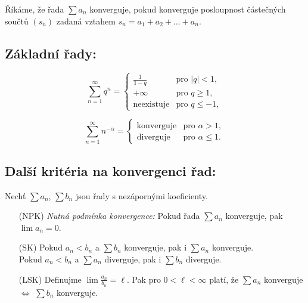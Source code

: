 \begin{definition}
	Říkáme, že řada $\sum a_n$ konverguje, pokud konverguje posloupnost částečných součtů $(s_n)$ zadaná vztahem $s_n = a_1 + a_2 + \dots + a_n$. 
	\label{def:konvergentni_rada}
\end{definition}

\subsection{Základní řady:}

\begin{equation}
	\sum_{n=1}^{\infty} q^n =
	\begin{cases}
		\frac{1}{1-q}			& \text{pro } |q| < 1, \\
		+\infty 	   			& \text{pro } q \geq 1, \\
		\text{neexistuje} & \text{pro } q \leq -1,
	\end{cases}
	\label{eq:rada_q_na_n}
\end{equation}

\begin{equation}
	\sum_{n=1}^{\infty} n^{-\alpha} =
	\begin{cases}
		\text{konverguje}  & \text{pro } \alpha > 1, \\
		\text{diverguje}   & \text{pro } \alpha \leq 1.
	\end{cases}
	\label{eq:rada_n_na_alpha}
\end{equation}


\subsection{Další kritéria na konvergenci řad:}

\begin{theorem}
	Nechť $\sum a_n$, $\sum b_n$ jsou řady s nezápornými koeficienty. 
	\begin{itemize}

		\item[(NPK)] \emph{Nutná podmínka konvergence:} \label{thm:konvergence_kriterium_nutna_podminka_konvergence}
			Pokud řada $\sum a_n$ konverguje, pak $\lim a_n = 0$.

		\item[(SK)] \label{thm:konvergence_kriterium_SK}
			Pokud $a_n < b_n$ a $\sum b_n$ konverguje, pak i $\sum a_n$ konverguje. \\ 
			Pokud $a_n < b_n$ a $\sum a_n$ diverguje, pak i $\sum b_n$ diverguje.

		\item[(LSK)] \label{thm:konvergence_kriterium_LSK}
			Definujme $\lim \frac{a_n}{b_n} = \ell$. Pak pro $0 < \ell < \infty$ platí, že $\sum a_n$ konverguje $\Leftrightarrow$ $\sum b_n$ konverguje.
	\end{itemize}
	\label{thm:konvergence_rad}
\end{theorem}

